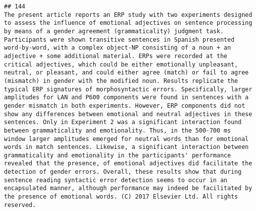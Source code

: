 \documentclass[
  english,
  man]{apa6}
\begin{document}
\begin{verbatim}
## 144                                                                                                                                                                                                                                                                                                                                                                                                                                                                                                                                                                                                                                                                                                                                                                                                                                                                                                                                                                                                                                    The present article reports an ERP study with two experiments designed to assess the influence of emotional adjectives on sentence processing by means of a gender agreement (grammaticality) judgment task. Participants were shown transitive sentences in Spanish presented word-by-word, with a complex object-NP consisting of a noun + an adjective + some additional material. ERPs were recorded at the critical adjectives, which could be either emotionally unpleasant, neutral, or pleasant, and could either agree (match) or fail to agree (mismatch) in gender with the modified noun. Results replicate the typical ERP signatures of morphosyntactic errors. Specifically, larger amplitudes for LAN and P600 components were found in sentences with a gender mismatch in both experiments. However, ERP components did not show any differences between emotional and neutral adjectives in these sentences. Only in Experiment 2 was a significant interaction found between grammaticality and emotionality. Thus, in the 500-700 ms window larger amplitudes emerged for neutral words than for emotional words in match sentences. Likewise, a significant interaction between grammaticality and emotionality in the participants' performance revealed that the presence, of emotional adjectives did facilitate the detection of gender errors. Overall, these results show that during sentence reading syntactic error detection seems to occur in an encapsulated manner, although performance may indeed be facilitated by the presence of emotional words. (C) 2017 Elsevier Ltd. All rights reserved.

\end{verbatim}
\end{document}
